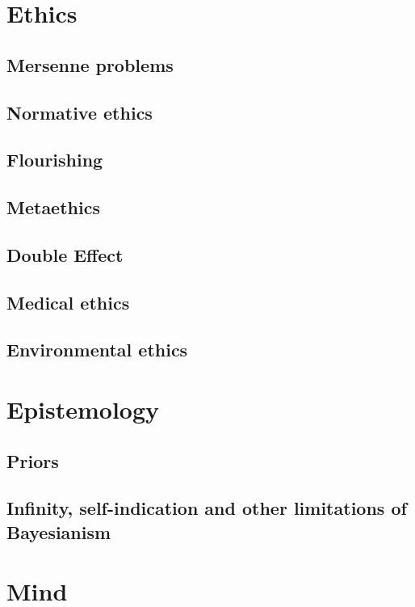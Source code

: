 \def\mychapter{II}

\chapter{Ethics}\label{ch:ethics}
\section{Mersenne problems}
\section{Normative ethics}
\section{Flourishing}
\section{Metaethics}
\section{Double Effect}
\section{Medical ethics}
\section{Environmental ethics}
\chaptertail 

\def\mychapter{III}

\chapter{Epistemology}\label{ch:epistemology}
\section{Priors}
\section{Infinity, self-indication and other limitations of Bayesianism}
\chaptertail 

\def\mychapter{IV}

\chapter{Mind}\label{ch:mind}
\chaptertail 

\def\mychapter{V}

